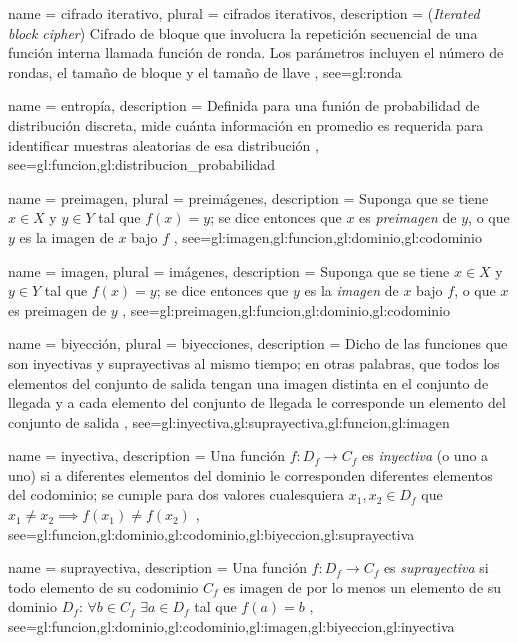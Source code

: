 {
  name = cifrado iterativo,
  plural = cifrados iterativos,
  description = {
    (\textit{Iterated block cipher}) Cifrado de bloque que involucra la
    repetición secuencial de una función interna llamada función de ronda. Los
    parámetros incluyen el número de rondas, el tamaño de bloque y
    el tamaño de llave%
  },
  see={gl:ronda}
}

{
  name = entropía,
  description = {
    Definida para una funión de probabilidad de distribución discreta,
    mide cuánta información en promedio es requerida para identificar
    muestras aleatorias de esa distribución%
  },
  see={gl:funcion,gl:distribucion_probabilidad}
}

{
  name = preimagen,
  plural = preimágenes,
  description = {
    Suponga que se tiene $x \in X$ y $y \in Y$ tal que $f(x) = y$;
    se dice entonces que $x$ es \textit{preimagen} de $y$, o que
    $y$ es la imagen de $x$ bajo $f$%
  },
  see={gl:imagen,gl:funcion,gl:dominio,gl:codominio}
}

{
  name = imagen,
  plural = imágenes,
  description = {
    Suponga que se tiene $x \in X$ y $y \in Y$ tal que $f(x) = y$;
    se dice entonces que $y$ es la \textit{imagen} de $x$ bajo $f$,
    o que $x$ es preimagen de $y$%
  },
  see={gl:preimagen,gl:funcion,gl:dominio,gl:codominio}
}

{
  name = biyección,
  plural = biyecciones,
  description = {
    Dicho de las funciones que son inyectivas y
    suprayectivas al mismo tiempo; en otras palabras, que todos los
    elementos del conjunto de salida tengan una imagen distinta en el conjunto
    de llegada y a cada elemento del conjunto de llegada le corresponde
    un elemento del conjunto de salida%
  },
  see={gl:inyectiva,gl:suprayectiva,gl:funcion,gl:imagen}
}

{
  name = inyectiva,
  description = {
    Una función $f:D_f \rightarrow C_f$ es \textit{inyectiva} (o uno a
    uno) si a diferentes elementos del dominio le corresponden
    diferentes elementos del codominio; se cumple para dos
    valores cualesquiera $x_1, x_2 \in D_f$ que
    $x_1 \neq x_2 \implies f(x_1) \neq f(x_2)$%
  },
  see={gl:funcion,gl:dominio,gl:codominio,gl:biyeccion,gl:suprayectiva}
}

{
  name = suprayectiva,
  description = {
    Una función $f:D_f \rightarrow C_f$ es \textit{suprayectiva} si
    todo elemento de su codominio $C_f$ es imagen de
    por lo menos un elemento de su dominio $D_f$: $\forall b \in C_f$
    $\exists a \in D_f$ tal que $f(a)=b$%
  },
  see={gl:funcion,gl:dominio,gl:codominio,gl:imagen,gl:biyeccion,gl:inyectiva}
}

